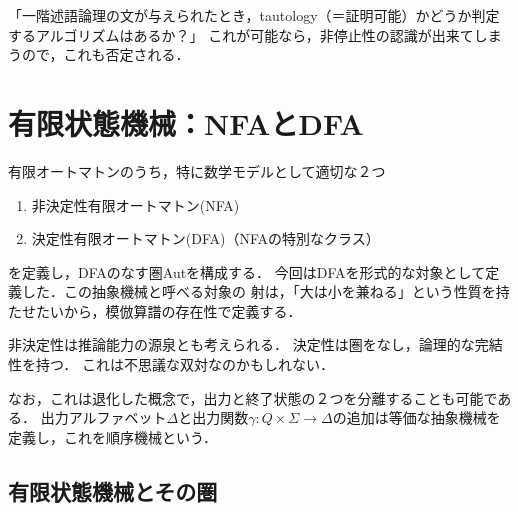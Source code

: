 \begin{example}\label{problem-Entscheidungsproblem}
    「一階述語論理の文が与えられたとき，tautology（＝証明可能）かどうか判定するアルゴリズムはあるか？」
    これが可能なら，非停止性の認識が出来てしまうので，これも否定される．
\end{example}

\section{有限状態機械：NFAとDFA}

\begin{tcolorbox}[colframe=ForestGreen, colback=ForestGreen!10!white, breakable,
    title=NFAとDFA]
    有限オートマトンのうち，特に数学モデルとして適切な２つ
    \begin{enumerate}
        \item 非決定性有限オートマトン(NFA)
        \item 決定性有限オートマトン(DFA)（NFAの特別なクラス）
    \end{enumerate}
    を定義し，DFAのなす圏Autを構成する．
    今回はDFAを形式的な対象として定義した．この抽象機械と呼べる対象の
    射は，「大は小を兼ねる」という性質を持たせたいから，模倣算譜の存在性で定義する．

    非決定性は推論能力の源泉とも考えられる．
    決定性は圏をなし，論理的な完結性を持つ．
    これは不思議な双対なのかもしれない．

    なお，これは退化した概念で，出力と終了状態の２つを分離することも可能である．
    出力アルファベット$\Delta$と出力関数$\gamma:Q\times\Sigma\to\Delta$の追加は等価な抽象機械を定義し，これを順序機械という．
\end{tcolorbox}

\subsection{有限状態機械とその圏}

